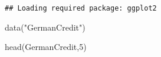 \documentclass[
]{book}
\newenvironment{Shaded}{\begin{snugshade}}{\end{snugshade}}
\newcommand{\DecValTok}[1]{\textcolor[rgb]{0.00,0.00,0.81}{#1}}
\newcommand{\FunctionTok}[1]{\textcolor[rgb]{0.00,0.00,0.00}{#1}}
\newcommand{\NormalTok}[1]{#1}
\newcommand{\StringTok}[1]{\textcolor[rgb]{0.31,0.60,0.02}{#1}}
\begin{document}
\begin{verbatim}
## Loading required package: ggplot2
\end{verbatim}

\begin{Shaded}
\begin{Highlighting}[]
\FunctionTok{data}\NormalTok{(}\StringTok{"GermanCredit"}\NormalTok{)}
\end{Highlighting}
\end{Shaded}

\begin{Shaded}
\begin{Highlighting}[]
\FunctionTok{head}\NormalTok{(GermanCredit,}\DecValTok{5}\NormalTok{)}
\end{Highlighting}
\end{Shaded}
\end{document}
